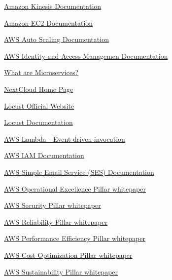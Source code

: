 \documentclass{article}
\begin{document}
\begin{thebibliography}{9}
\href{https://docs.aws.amazon.com/kinesis/}{Amazon Kinesis Documentation}

\href{https://docs.aws.amazon.com/ec2/}{Amazon EC2 Documentation}

 \href{https://docs.aws.amazon.com/autoscaling/}{AWS Auto Scaling Documentation}

 \href{https://docs.aws.amazon.com/iam/}{AWS  Identity and Access Managemen Documentation}

\href{https://aws.amazon.com/microservices/}{What are Microservices?}


\href{https://nextcloud.com/}{NextCloud Home Page}

\href{https://locust.io/}{Locust Official Website}

 \href{https://docs.locust.io/en/stable/}{Locust Documentation}

\href{https://docs.aws.amazon.com/lambda/latest/dg/lambda-services.html#event-driven-invocation}{AWS Lambda - Event-driven invocation}

\href{https://aws.amazon.com/iam/}{AWS IAM Documentation}

\href{https://aws.amazon.com/ses/}{AWS Simple Email Service (SES) Documentation}

\href{https://docs.aws.amazon.com/wellarchitected/latest/operational-excellence-pillar/welcome.html}{AWS Operational Excellence Pillar whitepaper}

\href{https://docs.aws.amazon.com/wellarchitected/latest/security-pillar/welcome.html}{AWS Security Pillar whitepaper}

\href{https://docs.aws.amazon.com/wellarchitected/latest/reliability-pillar/welcome.html}{AWS Reliability Pillar whitepaper}

\href{https://docs.aws.amazon.com/wellarchitected/latest/performance-efficiency-pillar/welcome.html}{AWS Performance Efficiency Pillar whitepaper}

\href{https://docs.aws.amazon.com/wellarchitected/latest/cost-optimization-pillar/welcome.html}{AWS Cost Optimization Pillar whitepaper}

\href{https://docs.aws.amazon.com/wellarchitected/latest/sustainability-pillar/welcome.html}{AWS Sustainability Pillar whitepaper}


\end{thebibliography}
\end{document}
